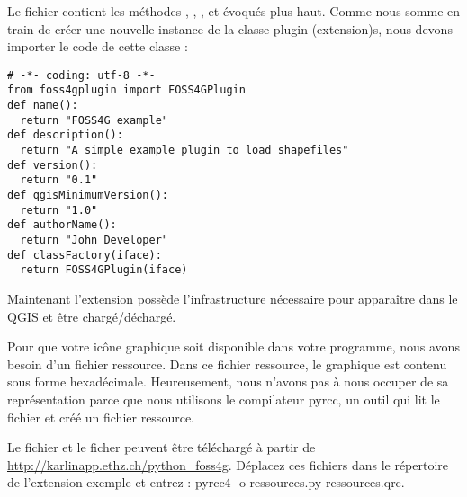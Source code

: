 Le fichier  contient les m\'ethodes ,
, , 
et  \'evoqu\'es plus haut. Comme nous somme en train de cr\'eer
une nouvelle instance de la classe plugin (extension)s, nous devons importer le code de cette
classe :

\begin{verbatim}
# -*- coding: utf-8 -*-
from foss4gplugin import FOSS4GPlugin
def name():
  return "FOSS4G example"
def description():
  return "A simple example plugin to load shapefiles"
def version():
  return "0.1"
def qgisMinimumVersion():
  return "1.0"
def authorName():
  return "John Developer"
def classFactory(iface):
  return FOSS4GPlugin(iface)
\end{verbatim}

Maintenant l'extension poss\`ede l'infrastructure n\'ecessaire pour appara\^itre dans le
 QGIS et \^etre
charg\'e/d\'echarg\'e.


Pour que votre ic\^one graphique soit disponible dans votre programme, nous avons
besoin d'un fichier ressource. Dans ce fichier ressource, le graphique est
contenu sous forme hexad\'ecimale. Heureusement, nous n'avons pas \`a nous occuper de
sa repr\'esentation parce que nous utilisons le compilateur pyrcc, un outil qui
lit le fichier  et cr\'e\'e un fichier ressource.

Le fichier  et le ficher  peuvent
\^etre t\'el\'echarg\'e \`a partir de \url{http://karlinapp.ethz.ch/python\_foss4g}.
D\'eplacez ces fichiers dans le r\'epertoire de l'extension exemple
 et entrez : pyrcc4 -o
ressources.py ressources.qrc.

